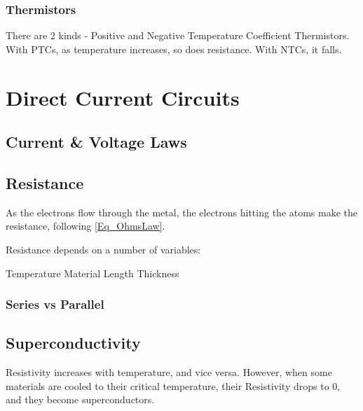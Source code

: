 \subsection{Thermistors}
There are 2 kinds - Positive and Negative Temperature Coefficient Thermistors. With PTCs, as temperature increases, so does resistance. With NTCs, it falls.

\chapter{Direct Current Circuits}
\section{Current \& Voltage Laws}

\section{Resistance}
As the electrons flow through the metal, the electrons hitting the atoms make the resistance, following \eqref{Eq_OhmsLaw}.

Resistance depends on a number of variables:
\begin{itemize}
	\ii Temperature
	\ii Material
	\ii Length
	\ii Thickness
\end{itemize}

\subsection{Series vs Parallel}

\section{Superconductivity}
Resistivity increases with temperature, and vice versa.
However, when some materials are cooled to their critical temperature, their Resistivity drops to 0, and they become superconductors.


